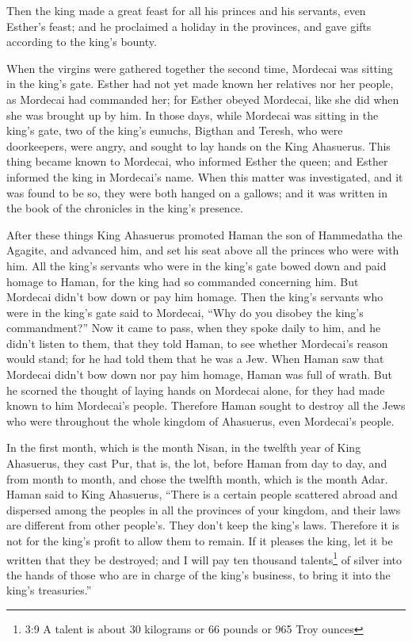 \myverse{}Then the king made a great feast for all his princes and his
servants, even Esther’s feast; and he proclaimed a holiday in the provinces, and gave gifts according
to the king’s bounty.

\myverse{}When the virgins were gathered together the second time, Mordecai
was sitting in the king’s gate.
\myverse{}Esther had not yet made known her relatives nor her people, as Mordecai had
commanded her; for Esther obeyed Mordecai, like she did when she was brought up by him.
\myverse{}In those days, while Mordecai was sitting in the king’s gate, two of the king’s
eunuchs, Bigthan and Teresh, who were doorkeepers, were angry, and sought to lay hands on the King Ahasuerus.
\myverse{}This thing became known to Mordecai, who informed Esther the queen; and Esther
informed the king in Mordecai’s name.
\myverse{}When this matter was investigated, and it was found to be so, they were both
hanged on a gallows; and it was written in the book of the chronicles in the king’s presence.


\mychapter{}\myverse*{}After these things King Ahasuerus promoted Haman the son of Hammedatha
the Agagite, and advanced him, and set his seat above all the princes who were with him.
\myverse{}All the king’s servants who were in the king’s gate bowed down and paid homage
to Haman, for the king had so commanded concerning him. But Mordecai didn’t bow down or pay him homage.
\myverse{}Then the king’s servants who were in the king’s gate said to Mordecai, “Why
do you disobey the king’s commandment?”
\myverse{}Now it came to pass, when they spoke daily to him, and he didn’t listen to them,
that they told Haman, to see whether Mordecai’s reason would stand; for he had told them that he was a
Jew.
\myverse{}When Haman saw that Mordecai didn’t bow down nor pay him homage, Haman was full
of wrath.
\myverse{}But he scorned the thought of laying hands on Mordecai alone, for they had made
known to him Mordecai’s people. Therefore Haman sought to destroy all the Jews who were throughout the
whole kingdom of Ahasuerus, even Mordecai’s people.

\myverse{}In the first month, which is the month Nisan, in the twelfth year
of King Ahasuerus, they cast Pur, that is, the lot, before Haman from day to day, and from month to month,
and chose the twelfth month, which is the month Adar.
\myverse{}Haman said to King Ahasuerus, “There is a certain people scattered abroad and
dispersed among the peoples in all the provinces of your kingdom, and their laws are different from other
people’s. They don’t keep the king’s laws. Therefore it is not for the king’s profit to allow them to
remain.
\myverse{}If it pleases the king, let it be written that they be destroyed; and I will
pay ten thousand talents\footnote{3:9 A talent is about 30 kilograms or 66 pounds or 965 Troy ounces} of silver into the hands
of those who are in charge of the king’s business, to bring it into the king’s treasuries.”

